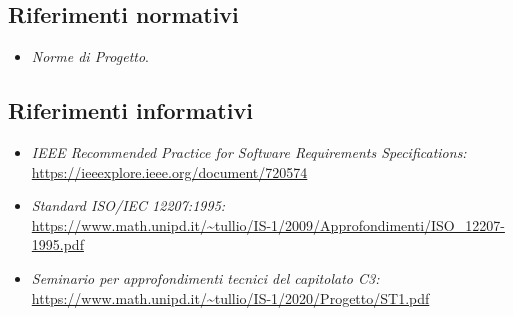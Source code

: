 \subsection{Riferimenti normativi}\label{IntroduzioneRiferimentiNormativi}
\begin{itemize}
	\item \textit{Norme di Progetto}.
\end{itemize}
\subsection{Riferimenti informativi}\label{IntroduzioneRiferimentiInformativi}
\begin{itemize}
	\item \textit{IEEE Recommended Practice for Software Requirements Specifications:}\\
		\url{https://ieeexplore.ieee.org/document/720574}
	\item \textit{Standard ISO/IEC 12207:1995:}\\
		\url{https://www.math.unipd.it/~tullio/IS-1/2009/Approfondimenti/ISO_12207-1995.pdf}
	\item \textit{Seminario per approfondimenti tecnici del capitolato C3:}\\
		\url{https://www.math.unipd.it/~tullio/IS-1/2020/Progetto/ST1.pdf}		
\end{itemize}